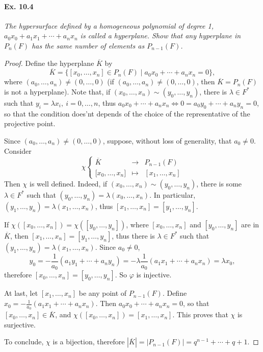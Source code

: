 \documentclass[11pt,a4paper]{article}
\begin{document}
\paragraph{Ex. 10.4} {\it The hypersurface defined by a homogeneous polynomial of degree 1, $a_0x_0+a_1x_1+\cdots +a_nx_n $ is called a hyperplane. Show that any hyperplane in $P_n(F)$ has the same number of elements as $P_{n-1}(F)$.
}
\begin{proof}
Define the hyperplane $\overline{K}$ by
$$\overline{K} = \{[x_0,\ldots,x_n] \in P_n(F) \mid a_0 x_0 + \cdots +a_n x_n = 0\},$$
where $(a_0,\ldots,a_n) \ne (0,\ldots,0)$ (if $(a_0,\ldots,a_n) \ne (0,\ldots,0)$, then $\overline{K} = P_n(F)$ is not a hyperplane). Note that, if $(x_0,\ldots,x_n) \sim (y_0,\ldots,y_n)$, there is $\lambda \in F^*$ such that $y_i = \lambda x_i,\ i=0,\ldots,n$, thus $a_0 x_0 + \cdots +a_n x_n \iff 0 = a_0 y_0 + \cdots +a_n y_n = 0$, so that the condition does'nt depends of the choice of the representative of the projective point.

Since $(a_0,\ldots,a_n) \ne (0,\ldots,0)$, suppose, without loss of generality, that $a_0 \ne 0$. Consider
$$
\chi
\left\{
\begin{array}{ccl}
\overline{K} & \to & P_{n-1}(F)\\
{[}x_0,\ldots,x_n{]} & \mapsto & [x_1,\ldots, x_n]
\end{array}
\right.
$$
Then $\chi$ is well defined. Indeed, if $(x_0,\ldots,x_n) \sim (y_0,\ldots,y_n)$, there is some $\lambda \in F^*$ such that $(y_0,\ldots, y_n) = \lambda (x_0,\ldots,x_n)$. In particular, $(y_1,\ldots, y_n) = \lambda (x_1,\ldots,x_n)$, thus $[x_1,\ldots,x_n] = [y_1,\ldots,y_n]$.

If $\chi([x_0,\ldots,x_n]) =  \chi([y_0,\ldots,y_n])$, where $[x_0,\ldots, x_n]$ and $[y_0,\ldots, y_n]$ are in $\overline{K}$, then $[x_1,\ldots, x_n] = [y_1,\ldots, y_n]$, thus there is $\lambda \in F^*$ such that $(y_1,\ldots, y_n) = \lambda (x_1,\ldots, x_n)$. Since $a_0 \ne 0$,
$$y_0 = -\frac{1}{a_0}(a_1y_1 + \cdots + a_ny_n) = - \lambda \frac{1}{a_0}(a_1x_1 + \cdots + a_nx_n) = \lambda x_0,$$
therefore $[x_0,\ldots,x_n] = [y_0,\ldots,y_n]$. So $\varphi$ is injective.

At last, let $[x_1,\ldots, x_n]$ be any point of $P_{n-1}(F)$. Define $x_0 = - \frac{1}{a_0}(a_1x_1 + \cdots + a_nx_n)$. Then $a_0x_0 + \cdots +a_nx_n = 0$, so that $[x_0,\ldots,x_n] \in \overline{K}$, and $\chi([x_0,\ldots,x_n]) = [x_1,\ldots,x_n]$. This proves that $\chi$ is surjective.

To conclude, $\chi$ is a bijection, therefore $|\overline{K}| = |P_{n-1}(F)| = q^{n-1} + \cdots+ q+1$.
\end{proof}
\end{document}
